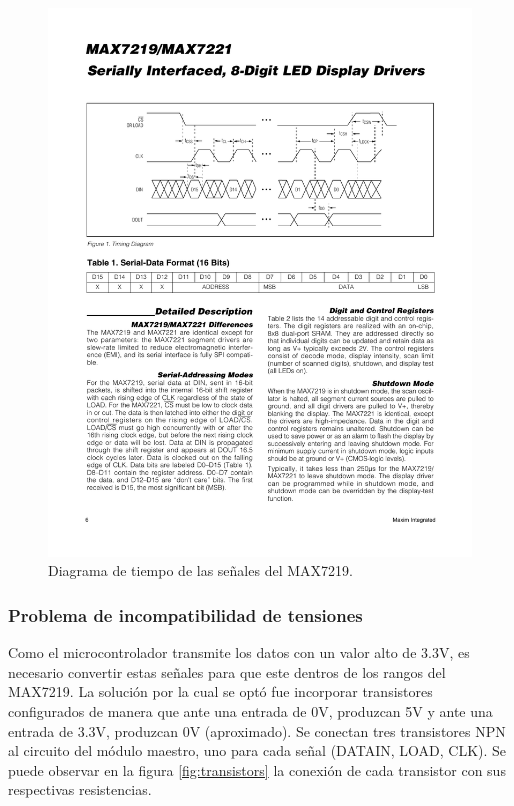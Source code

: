 \begin{figure}[ht!]
	\centering
	\begin{center}
		\includegraphics[width=\textwidth]{imagenes/hw/timingDiagram.pdf}
		\caption{Diagrama de tiempo de las señales del MAX7219.}
		\label{fig:spi-timing-diagram}
	\end{center}
\end{figure}

\subsubsection{Problema de incompatibilidad de tensiones}
Como el microcontrolador transmite los datos con un valor alto de 3.3V, es necesario convertir estas señales para que este dentros de los rangos del MAX7219. La solución por la cual se optó fue incorporar transistores configurados de manera que ante una entrada de 0V, produzcan 5V y ante una entrada de 3.3V, produzcan 0V (aproximado). Se conectan tres transistores NPN al circuito del módulo maestro, uno para cada señal (DATAIN, LOAD, CLK). Se puede observar en la figura \ref{fig:transistors} la conexión de cada transistor con sus respectivas resistencias. 

